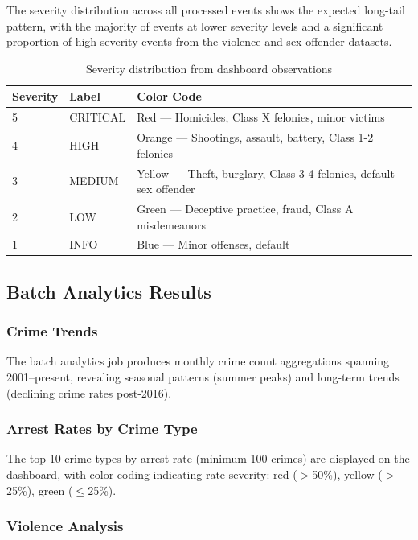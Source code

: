 \documentclass[12pt,a4paper]{article}
\begin{document}
The severity distribution across all processed events shows the expected long-tail pattern, with the majority of events at lower severity levels and a significant proportion of high-severity events from the violence and sex-offender datasets.

\begin{table}[H]
\centering
\caption{Severity distribution from dashboard observations}
\begin{tabular}{l l l}
\toprule
\textbf{Severity} & \textbf{Label} & \textbf{Color Code} \\
\midrule
5 & CRITICAL & Red --- Homicides, Class X felonies, minor victims \\
4 & HIGH & Orange --- Shootings, assault, battery, Class 1-2 felonies \\
3 & MEDIUM & Yellow --- Theft, burglary, Class 3-4 felonies, default sex offender \\
2 & LOW & Green --- Deceptive practice, fraud, Class A misdemeanors \\
1 & INFO & Blue --- Minor offenses, default \\
\bottomrule
\end{tabular}
\end{table}

\subsection{Batch Analytics Results}

\subsubsection{Crime Trends}

The batch analytics job produces monthly crime count aggregations spanning 2001--present, revealing seasonal patterns (summer peaks) and long-term trends (declining crime rates post-2016).

\subsubsection{Arrest Rates by Crime Type}

The top 10 crime types by arrest rate (minimum 100 crimes) are displayed on the dashboard, with color coding indicating rate severity: red ($>$50\%), yellow ($>$25\%), green ($\leq$25\%).

\subsubsection{Violence Analysis}
\end{document}
